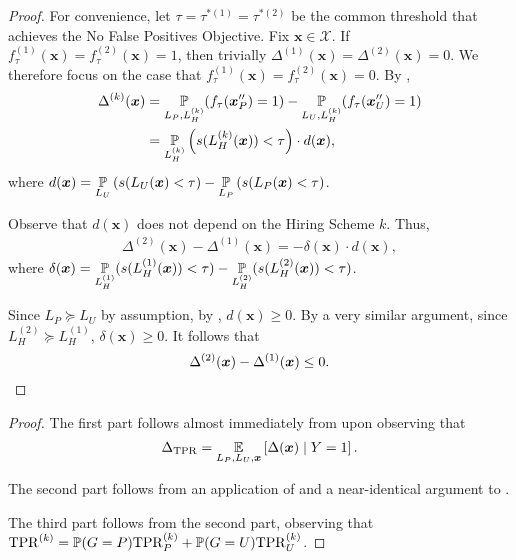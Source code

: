     \begin{proof}
        For convenience, let \(\tau = \tau^{*(1)}  = \tau^{*(2)}\) be the common threshold that achieves the No False Positives Objective.  Fix \(\bm{x} \in \mathcal{X}\). If \(f^{(1)}_\tau(\bm{x}) = f^{(2)}_\tau(\bm{x}) = 1\), then trivially \(\Delta^{(1)}(\bm{x}) = \Delta^{(2)}(\bm{x}) = 0\). We therefore focus on the case that \(f^{(1)}_\tau(\bm{x}) = f^{(2)}_\tau(\bm{x}) = 0\). By ,
        \begin{align*}
            \Delta^{(k)}(\bm{x})
            &= \operatorname*{\mathbb{P}}_{L_P, L_H^{(k)}}(f_\tau(\bm{x}''_P) = 1) - 
            \operatorname*{\mathbb{P}}_{L_U, L_H^{(k)}}(f_\tau(\bm{x}''_U) = 1)
        \\  &= 
            \operatorname*{\mathbb{P}}_{L_H^{(k)}}\left( 
                s(L_H^{(k)}(\bm{x})) < \tau
             \right) \cdot d(\bm{x}),
        \end{align*}
        where 
        \(
        \displaystyle
        d(\bm{x}) = 
        \operatorname*{\mathbb{P}}_{L_U}\left( 
            s(L_U(\bm{x}) < \tau
         \right)
        - 
        \operatorname*{\mathbb{P}}_{L_P}\left( 
            s(L_P(\bm{x}) < \tau
         \right)
        \).
        
        Observe that \(d(\bm{x})\) does not depend on the Hiring Scheme \(k\). Thus,
        \begin{gather*}
            \Delta^{(2)}(\bm{x}) - \Delta^{(1)}(\bm{x})
        =
            - \delta (\bm{x}) \cdot d(\bm{x}),
        \end{gather*}
        where
        \(\displaystyle
            \delta(\bm{x}) = 
            \operatorname*{\mathbb{P}}_{L_H^{(1)}}(
                s(L_H^{(1)}(\bm{x})) < \tau
            ) - 
            \operatorname*{\mathbb{P}}_{L_H^{(2)}}(
                s(L_H^{(2)}(\bm{x})) < \tau
            )
        \).

        
        Since \(L_P \succeq L_U\) by assumption, by , \(d(\bm{x}) \geq 0\). By a very similar argument, since \(L_H^{(2)} \succeq L_H^{(1)}\), \(\delta(\bm{x}) \geq 0\). It follows that
        \[\Delta^{(2)}(\bm{x}) - \Delta^{(1)}(\bm{x}) \leq 0.\qedhere\]
    \end{proof}

\corollaryTwo*
    \begin{proof}
        The first part follows almost immediately from  upon observing that
        \[\Delta_{\mathrm{TPR}} = \operatorname*{\mathbb{E}}_{L_P, L_U, \bm{x}} \left[ \Delta(\bm{x}) \mid Y = 1 \right].\]

        The second part follows from an application of  and a near-identical argument to .

        The third part follows from the second part, observing that \(\mathrm{TPR}^{(k)} = \operatorname*{\mathbb{P}}(G = P) \mathrm{TPR}_P^{(k)} + \operatorname*{\mathbb{P}}(G = U)\mathrm{TPR}_U^{(k)}\).
    \end{proof}

